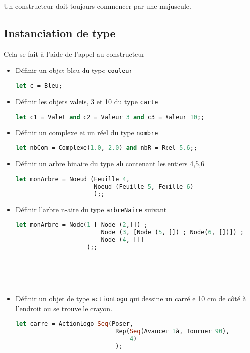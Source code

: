\begin{attention}
	Un constructeur doit toujours commencer par une majuscule.
\end{attention}

\subsection{Instanciation de type}
Cela se fait à l'aide de l'appel au constructeur
\begin{exemple}
\begin{itemize}
	\item Définir un objet bleu du type \texttt{couleur}
	\begin{lstlisting}[language=Caml, numbers=none, framerule=0pt]
let c = Bleu;
	\end{lstlisting}
\item Définir les objets valets, 3 et 10 du type \texttt{carte}
	\begin{lstlisting}[language=Caml, numbers=none, framerule=0pt]
let c1 = Valet and c2 = Valeur 3 and c3 = Valeur 10;;
	\end{lstlisting}
\item Définir un complexe et un réel du type \texttt{nombre}
	\begin{lstlisting}[language=Caml, numbers=none, framerule=0pt]
let nbCom = Complexe(1.0, 2.0) and nbR = Reel 5.6;;
	\end{lstlisting}
\item Définir un arbre binaire du type \texttt{ab} contenant les entiers 4,5,6
	\begin{lstlisting}[language=Caml, numbers=none, framerule=0pt]
let monArbre = Noeud (Feuille 4,
					  Noeud (Feuille 5, Feuille 6)
					  );;
	\end{lstlisting}
	\item Définir l'arbre n-aire du type \texttt{arbreNaire} suivant
	\begin{lstlisting}[language=Caml, numbers=none, framerule=0pt]
let monArbre = Node(1 [	Node (2,[]) ; 
						Node (3, [Node (5, []) ; Node(6, [])]) ;
						Node (4, []]
					);;
	\end{lstlisting}
	~\\~\\~
	\item Définir un objet de type \texttt{actionLogo} qui dessine un carré e 10 cm de côté à l'endroit ou se trouve le crayon.
	\begin{lstlisting}[language=Caml, numbers=none, framerule=0pt]
let carre = ActionLogo Seq(Poser, 
							Rep(Seq(Avancer 1à, Tourner 90),
								4)
							);
	\end{lstlisting}
\end{itemize}
\end{exemple}

